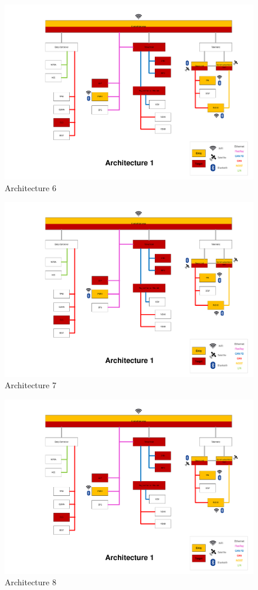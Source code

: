 \begin{figure}
    \caption{Architecture 6}
    \includegraphics[width=\textwidth, page=6]{../Architectures-survey.pdf}
\end{figure}

\begin{figure}
    \caption{Architecture 7}
    \includegraphics[width=\textwidth, page=7]{../Architectures-survey.pdf}
\end{figure}

\begin{figure}
    \caption{Architecture 8}
    \includegraphics[width=\textwidth, page=8]{../Architectures-survey.pdf}
\end{figure}

